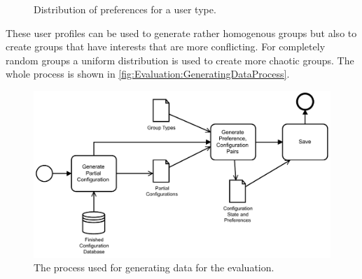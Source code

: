 \pgfplotsset{height=5cm,width=\textwidth,compat=1.8}
\begin{figure}
 \caption{Distribution of preferences for a user type.}
\label{fig:Evaluation:DataGeneration}
\end{figure}

These user profiles can be used to generate rather homogenous groups but also to create groups that have interests that are more conflicting. For completely random groups a uniform distribution is used to create more chaotic groups. The whole process is shown in \autoref{fig:Evaluation:GeneratingDataProcess}.



\begin{figure}
    \centering
    \includegraphics[width=1\textwidth]{./figures/60_evaluation/bpmn_evaluation_input_data_generation.pdf}
    \caption{The process used for generating data for the evaluation.}
    \label{fig:Evaluation:GeneratingDataProcess}
\end{figure}